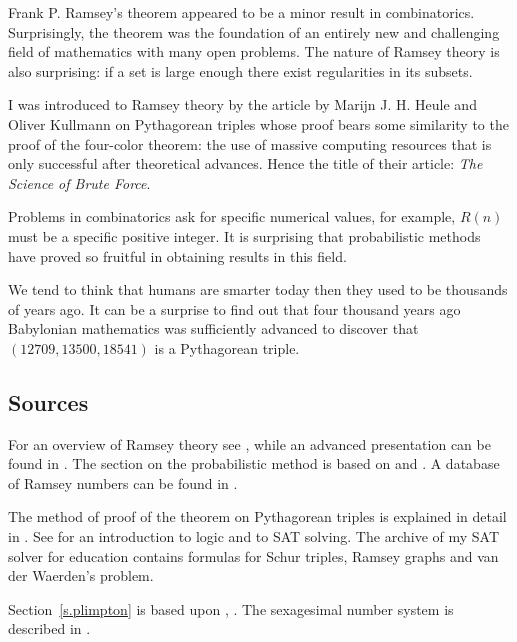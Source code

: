 Frank P. Ramsey's theorem  appeared to be a minor result in combinatorics. Surprisingly, the theorem was the foundation of an entirely new and challenging field of mathematics with many open problems. The nature of Ramsey theory is also surprising: if a set is large enough there exist regularities in its subsets.

I was introduced to Ramsey theory by the article by Marijn J. H. Heule and Oliver Kullmann  on Pythagorean triples whose proof bears some similarity to the proof of the four-color theorem: the use of massive computing resources that is only successful after theoretical advances. Hence the title of their article: \textit{The Science of Brute Force}.

Problems in combinatorics ask for specific numerical values, for example, $R(n)$ must be a specific positive integer. It is surprising that probabilistic methods have proved so fruitful in obtaining results in this field.

We tend to think that humans are smarter today then they used to be thousands of years ago. It can be a surprise to find out that four thousand years ago Babylonian mathematics was sufficiently advanced to discover that $(12709, 13500, 18541)$ is a Pythagorean triple.

\subsection*{Sources}

For an overview of Ramsey theory see \cite{burton}, while an advanced presentation can be found in \cite{rudiments}. The section on the probabilistic method is based on \cite[Example~4o]{ross} and \cite[Chapter~4]{burton}. A database of Ramsey numbers can be found in \cite{mckay}.

The method of proof of the theorem on Pythagorean triples is explained in detail in \cite{brute}. See \cite{mlcs} for an introduction to logic and to SAT solving. The archive of my SAT solver for education \cite{joss} contains formulas for Schur triples, Ramsey graphs and van der Waerden's problem. 

Section~\ref{s.plimpton} is based upon \cite{wiki:plimpton}, \cite{robson}. 
The sexagesimal number system is described in \cite{wiki:sexagesimal}.
